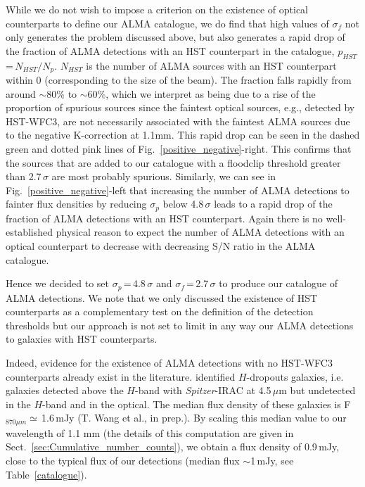 \documentclass[longauth]{aa}
\begin{document}
While we do not wish to impose a criterion on the existence of optical counterparts to define our ALMA catalogue, we do find that high values of $\sigma_f$ not only generates the problem discussed above, but also generates a rapid drop of the fraction of ALMA detections with an HST counterpart in the \cite{Guo2013} catalogue, $p_{HST}$\,=\,$N_{HST}/N_p$. $N_{HST}$ is the number of ALMA sources with an HST counterpart within 0 (corresponding to the size of the beam). The fraction falls rapidly from around $\sim$80\% to $\sim$60\%, which we interpret as being due to a rise of the proportion of spurious sources since the faintest optical sources, e.g., detected by HST-WFC3, are not necessarily associated with the faintest ALMA sources due to the negative K-correction at 1.1mm.
This rapid drop can be seen in the dashed green and dotted pink lines of Fig.~\ref{positive_negative}-right. This confirms that the sources that are added to our catalogue with a floodclip threshold greater than 2.7\,$\sigma$ are most probably spurious. Similarly, we can see in Fig.~\ref{positive_negative}-left that increasing the number of ALMA detections to fainter flux densities by reducing $\sigma_p$ below 4.8\,$\sigma$ leads to a rapid drop of the fraction of ALMA detections with an HST counterpart. Again there is no well-established physical reason to expect the number of ALMA detections with an optical counterpart to decrease with decreasing S/N ratio in the ALMA catalogue.

Hence we decided to set $\sigma_p$\,=\,4.8\,$\sigma$ and $\sigma_f$\,=\,2.7\,$\sigma$ to produce our catalogue of ALMA detections. We note that we only discussed the existence of HST counterparts as a complementary test on the definition of the detection thresholds but our approach is not set to limit in any way our ALMA detections to galaxies with HST counterparts.

Indeed, evidence for the existence of ALMA detections with no HST-WFC3 counterparts already exist in the literature. \cite{Wang2016} identified $H$-dropouts galaxies, i.e. galaxies detected above the $H$-band with \textit{Spitzer}-IRAC at 4.5\,$\mu$m but undetected in the $H$-band and in the optical. The median flux density of these galaxies is F$_{870\mu m}\simeq\,$1.6\,mJy (T. Wang et al., in prep.). By scaling this median value to our wavelength of 1.1 mm (the details of this computation are given in Sect.~\ref{sec:Cumulative_number_counts}), we obtain a flux density of 0.9\,mJy, close to the typical flux of our detections (median flux $\sim$1\,mJy, see Table~\ref{catalogue}). 
\end{document}
